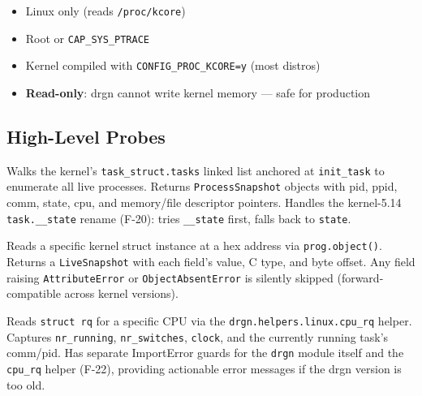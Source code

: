 \documentclass[11pt,a4paper]{article}
\newcommand{\coderef}[1]{\texttt{\small\color{layer2}#1}}
\begin{document}
\begin{tcolorbox}[
  colback=probe!5, colframe=probe!50, arc=4pt,
  title={\small\ttfamily Safety \& Access Requirements},
  fonttitle=\bfseries\small
]
\begin{itemize}[itemsep=1pt, leftmargin=1em]
  \item Linux only (reads \texttt{/proc/kcore})
  \item Root or \texttt{CAP\_SYS\_PTRACE}
  \item Kernel compiled with \texttt{CONFIG\_PROC\_KCORE=y} (most distros)
  \item \textbf{Read-only}: drgn cannot write kernel memory --- safe for production
\end{itemize}
\end{tcolorbox}

\subsection{High-Level Probes}

\begin{description}[leftmargin=1.5em, itemsep=4pt]
  \item[\texttt{list\_processes(max\_tasks)}]
        Walks the kernel's \texttt{task\_struct.tasks} linked list anchored at
        \texttt{init\_task} to enumerate all live processes.
        Returns \coderef{ProcessSnapshot} objects with pid, ppid, comm, state,
        cpu, and memory/file descriptor pointers. Handles the kernel-5.14
        \texttt{task.\_\_state} rename (F-20): tries \texttt{\_\_state} first,
        falls back to \texttt{state}.

  \item[\texttt{read\_struct(struct\_name, address, fields)}]
        Reads a specific kernel struct instance at a hex address via
        \texttt{prog.object()}. Returns a \coderef{LiveSnapshot} with each
        field's value, C type, and byte offset. Any field raising
        \texttt{AttributeError} or \texttt{ObjectAbsentError} is silently
        skipped (forward-compatible across kernel versions).

  \item[\texttt{read\_runqueue(cpu)}]
        Reads \texttt{struct rq} for a specific CPU via the
        \texttt{drgn.helpers.linux.cpu\_rq} helper. Captures
        \texttt{nr\_running}, \texttt{nr\_switches}, \texttt{clock}, and the
        currently running task's comm/pid. Has separate ImportError guards for
        the \texttt{drgn} module itself and the \texttt{cpu\_rq} helper (F-22),
        providing actionable error messages if the drgn version is too old.
\end{description}
\end{document}
